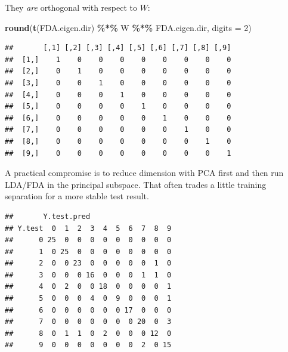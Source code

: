 \documentclass[
]{book}
\newenvironment{Shaded}{\begin{snugshade}}{\end{snugshade}}
\newcommand{\AttributeTok}[1]{\textcolor[rgb]{0.13,0.29,0.53}{#1}}
\newcommand{\DecValTok}[1]{\textcolor[rgb]{0.00,0.00,0.81}{#1}}
\newcommand{\FunctionTok}[1]{\textcolor[rgb]{0.13,0.29,0.53}{\textbf{#1}}}
\newcommand{\NormalTok}[1]{#1}
\newcommand{\OtherTok}[1]{\textcolor[rgb]{0.56,0.35,0.01}{#1}}
\newcommand{\SpecialCharTok}[1]{\textcolor[rgb]{0.81,0.36,0.00}{\textbf{#1}}}
\begin{document}
They \emph{are} orthogonal with respect to \(W\):

\begin{Shaded}
\begin{Highlighting}[]
\FunctionTok{round}\NormalTok{(}\FunctionTok{t}\NormalTok{(FDA.eigen.dir) }\SpecialCharTok{\%*\%}\NormalTok{ W }\SpecialCharTok{\%*\%}\NormalTok{ FDA.eigen.dir, }\AttributeTok{digits =} \DecValTok{2}\NormalTok{)}
\end{Highlighting}
\end{Shaded}

\begin{verbatim}
##       [,1] [,2] [,3] [,4] [,5] [,6] [,7] [,8] [,9]
##  [1,]    1    0    0    0    0    0    0    0    0
##  [2,]    0    1    0    0    0    0    0    0    0
##  [3,]    0    0    1    0    0    0    0    0    0
##  [4,]    0    0    0    1    0    0    0    0    0
##  [5,]    0    0    0    0    1    0    0    0    0
##  [6,]    0    0    0    0    0    1    0    0    0
##  [7,]    0    0    0    0    0    0    1    0    0
##  [8,]    0    0    0    0    0    0    0    1    0
##  [9,]    0    0    0    0    0    0    0    0    1
\end{verbatim}

A practical compromise is to reduce dimension with PCA first and then run LDA/FDA in the principal subspace. That often trades a little training separation for a more stable test result.

\begin{Shaded}
\end{Shaded}

\begin{verbatim}
##       Y.test.pred
## Y.test  0  1  2  3  4  5  6  7  8  9
##      0 25  0  0  0  0  0  0  0  0  0
##      1  0 25  0  0  0  0  0  0  0  0
##      2  0  0 23  0  0  0  0  0  1  0
##      3  0  0  0 16  0  0  0  1  1  0
##      4  0  2  0  0 18  0  0  0  0  1
##      5  0  0  0  4  0  9  0  0  0  1
##      6  0  0  0  0  0  0 17  0  0  0
##      7  0  0  0  0  0  0  0 20  0  3
##      8  0  1  1  0  2  0  0  0 12  0
##      9  0  0  0  0  0  0  0  2  0 15
\end{verbatim}
\end{document}
